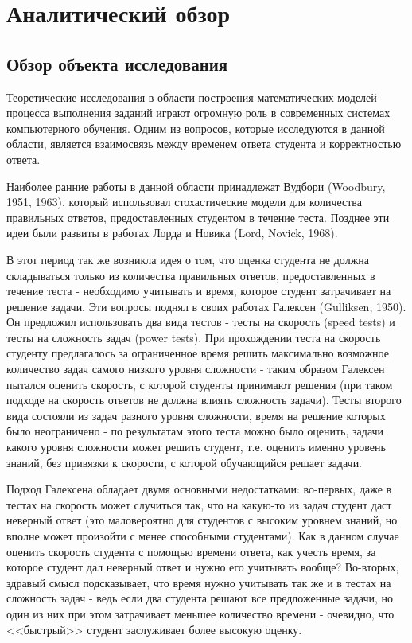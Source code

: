 


\section{Аналитический обзор}
\label{mainpart} 
\subsection{Обзор объекта исследования}

Теоретические исследования в области построения математических моде\-лей процесса выполнения заданий играют огромную роль в современных системах компьютерного обучения. Одним из вопросов, которые исследуются в данной области, является взаимосвязь между временем ответа студента и корректностью ответа.

Наиболее ранние работы в данной области принадлежат Вудбори (Woodbury, 1951\cite{30.}, 1963\cite{31.}), который использовал стохастические модели для коли\-чества правильных ответов, предоставленных студентом в течение теста. Поз\-днее эти идеи были развиты в работах  Лорда и Новика (Lord, Novick, 1968\cite{32.}).

В этот период так же возникла идея о том, что оценка студента не должна складываться только из количества правильных ответов, предоставленных в течение теста - необходимо учитывать и время, которое студент затрачивает на решение задачи. Эти вопросы поднял в своих работах Галексен (Gulliksen, 1950\cite{33.}). Он предложил использовать два вида тестов - тесты на скорость (speed tests) и тесты на сложность задач (power tests). При прохождении теста на скорость студенту предлагалось за ограни\-ченное время решить макси\-мально возможное количество задач самого низ\-кого уровня сложности - таким образом Галексен пытался оценить скорость, с которой студенты принимают решения (при таком подходе на скорость ответов не должна влиять сложность задачи). Тесты второго вида состояли из задач разного уровня сложности, время на решение которых было неограничено - по результатам этого теста можно было оценить, задачи какого уровня сложности может решить студент, т.е. оценить именно уровень знаний, без привязки к скорости, с которой обучающийся решает задачи.

 Подход Галексена обладает двумя основными недостатками: во-первых, даже в тестах на скорость может случиться так, что на какую-то из задач студент даст неверный ответ (это маловероятно для студентов с высоким уровнем знаний, но вполне может произойти с менее способными студентами). Как в данном случае оценить скорость студента с помощью времени ответа, как учесть время, за которое студент дал неверный ответ и нужно его учиты\-вать вообще? Во-вторых, здравый смысл подсказывает, что время нужно учитывать так же и в тестах на сложность задач - ведь если два студента решают все предложенные задачи, но один из них при этом затрачивает меньшее количество времени - очевидно, что <<быстрый>> студент заслуживает более высокую оценку.

